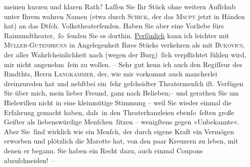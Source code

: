                meinen kurzen und klaren Rath? Laſſen Sie Ihr Stück ohne weitern Aufſchub unter Ihrem wahren Namen (etwa
               durch \textsc{Schick}, der das \textsc{Mscpt} jetzt in Händen hat) an das Dtſch. Volkstheaterſenden. Haben Sie aber eine Vorliebe fürs Raimundtheater, ſo ſenden Sie es dorthin. \uline{Perſönlich} kann ich leichter mit \textsc{Müller-Gutenbrunn} in Angelegenheit Ihres Stücks
               verkehren als mit \textsc{Bukovics}, der aller {\pb}Wahrſcheinlichkeit nach (wegen der Burg) ſich verpflichtet fühlen wird, mir nicht
               angenehm ſein zu wollen. – Sehr gut kenn ich auch den Regiſſeur des Rmdthts, Herrn \textsc{Langkammer}, der, wie mir vorkommt auch mancherlei dreinzureden hat und nebſtbei ein ſehr
               geſcheidter Theatermenſch iſt. Verfügen Sie über mich, mein lieber Freund, ganz nach
               Belieben;– und gerathen Sie um Hi{\geminationm}elswillen nicht in eine kleinmütige Stimmung –
               weil {\pb}Sie wieder einmal die Erfahrung gemacht haben, daſs in
               den Theaterkanzleien ebenſo ſelten große Geiſter als liebenswürdige Menſchen ſitzen –
               wenigſtens gegen »Unbekannte«. Aber Sie ſind wirklich wie ein Menſch, der durch
               eigene Kraft ein Vermögen erworben und plötzlich die Marotte hat, von den paar
               Kreuzern zu leben, mit denen er begann. Sie haben ein Recht dazu, auch einmal Coupons
               abzuſchneiden! –\pend
           
